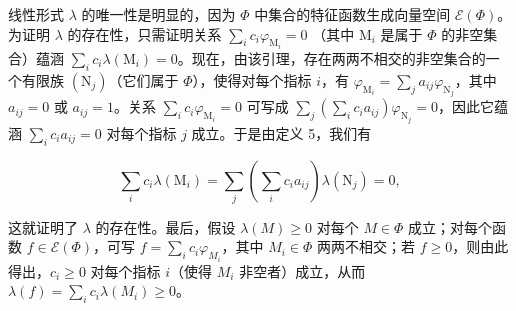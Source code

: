 线性形式 \(\lambda\) 的唯一性是明显的，因为 \(\Phi\) 中集合的特征函数生成向量空间 \(\mathcal{E}(\Phi)\)。为证明 \(\lambda\) 的存在性，只需证明关系 \(\sum_{i} c_i \varphi_{\mathrm{M}_i} = 0\) （其中 \(\mathrm{M}_i\) 是属于 \(\Phi\) 的非空集合）蕴涵 \(\sum_{i} c_i \lambda(\mathrm{M}_i) = 0\)。现在，由该引理，存在两两不相交的非空集合的一个有限族 \((\mathrm{N}_j)\)（它们属于 \(\Phi\)），使得对每个指标 \(i\)，有 \(\varphi_{\mathrm{M}_i} = \sum_{j} a_{ij} \varphi_{\mathrm{N}_j}\)，其中 \(a_{ij} = 0\) 或 \(a_{ij} = 1\)。关系 \(\sum_{i} c_i \varphi_{\mathrm{M}_i} = 0\) 可写成 \(\sum_{j} \left( \sum_{i} c_i a_{ij} \right) \varphi_{\mathrm{N}_j} = 0\)，因此它蕴涵 \(\sum_{i} c_i a_{ij} = 0\) 对每个指标 \(j\) 成立。于是由定义 5，我们有

\[
\sum_ {i} c _ {i} \lambda (\mathrm{M} _ {i}) = \sum_ {j} \left(\sum_ {i} c _ {i} a _ {i j}\right) \lambda (\mathrm{N} _ {j}) = 0,
\]

这就证明了 \(\lambda\) 的存在性。最后，假设 \(\lambda(M) \geqslant 0\) 对每个 \(M \in \Phi\) 成立；对每个函数 \(f \in \mathcal{E}(\Phi)\)，可写 \(f = \sum_{i} c_i \varphi_{M_i}\)，其中 \(M_i \in \Phi\) 两两不相交；若 \(f \geqslant 0\)，则由此得出，\(c_i \geqslant 0\) 对每个指标 \(i\)（使得 \(M_i\) 非空者）成立，从而 \(\lambda(f) = \sum_{i} c_i \lambda(M_i) \geqslant 0\)。


